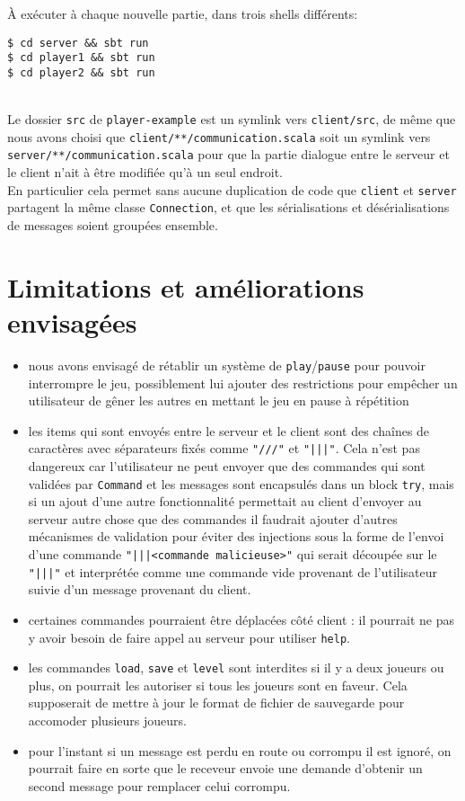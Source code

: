 \documentclass[a4paper,french]{article}
\newcommand{\ttt}[1]{\texttt{#1}}
\begin{document}
\`A exécuter à chaque nouvelle partie, dans trois shells différents:
\begin{lstlisting}
$ cd server && sbt run
$ cd player1 && sbt run
$ cd player2 && sbt run
\end{lstlisting}~\\

Le dossier \ttt{src} de \ttt{player-example} est un symlink vers \ttt{client/src}, de même que nous avons choisi
que \ttt{client/**/communication.scala} soit un symlink vers \ttt{server/**/communication.scala} pour que la partie
dialogue entre le serveur et le client n'ait à être modifiée qu'à un seul endroit.\\
En particulier cela permet sans aucune duplication de code que \ttt{client} et \ttt{server} partagent la même classe
\ttt{Connection}, et que les sérialisations et désérialisations de messages soient groupées ensemble.


\section{Limitations et améliorations envisagées}

\begin{itemize}
    \item nous avons envisagé de rétablir un système de \ttt{play}/\ttt{pause} pour pouvoir interrompre le jeu,
        possiblement lui ajouter des restrictions pour empêcher un utilisateur de gêner les autres en mettant le
        jeu en pause à répétition
    \item les items qui sont envoyés entre le serveur et le client sont des cha\^ines de caractères avec séparateurs
        fixés comme \ttt{"///"} et \ttt{"|||"}. Cela n'est pas dangereux car l'utilisateur ne peut envoyer
        que des commandes qui sont validées par \ttt{Command} et les messages sont encapsulés dans un block \ttt{try},
        mais si un ajout d'une autre fonctionnalité permettait au client d'envoyer au serveur autre chose que des commandes
        il faudrait ajouter d'autres mécanismes de validation pour éviter des injections sous la forme de l'envoi
        d'une commande \ttt{"|||<commande malicieuse>"} qui serait découpée sur le \ttt{"|||"} et interprétée
        comme une commande vide provenant de l'utilisateur suivie d'un message provenant du client.
    \item certaines commandes pourraient être déplacées côté client : il pourrait ne pas y avoir besoin de faire
        appel au serveur pour utiliser \ttt{help}.
    \item les commandes \ttt{load}, \ttt{save} et \ttt{level} sont interdites si il y a deux joueurs ou plus, on pourrait les
        autoriser si tous les joueurs sont en faveur. Cela supposerait de mettre à jour le format de fichier de sauvegarde
        pour accomoder plusieurs joueurs.
    \item pour l'instant si un message est perdu en route ou corrompu il est ignoré, on pourrait faire en sorte
        que le receveur envoie une demande d'obtenir un second message pour remplacer celui corrompu.
\end{itemize}
\end{document}
